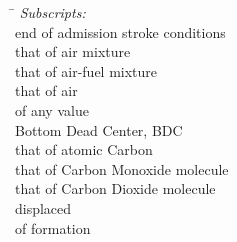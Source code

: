 \begin{tabbing}\hspace*{\lensymb}\=\hspace*{\lenWHAT}\kill
    {\em Subscripts:} \\
                                      \> end of admission stroke conditions                                                                                                       \\
              \> that of air mixture                                                                                                                      \\
             \> that of air-fuel mixture                                                                                                                 \\
               \> that of air                                                                                                                              \\
                                  \> of any value                                                                                                                             \\
    \tcs{{}_{\bdc}}                             \> Bottom Dead Center, BDC                                                                                                                  \\
            \> that of atomic Carbon                                                                                                                    \\
           \> that of Carbon Monoxide molecule                                                                                                         \\
          \> that of Carbon Dioxide molecule                                                                                                          \\
                                      \> displaced                                                                                                                                \\
                                      \> of formation                                                                                                                             \\

\end{tabbing}
